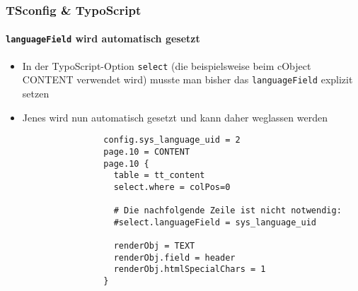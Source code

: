 \begin{frame}[fragile]
	\frametitle{TSconfig \& TypoScript}
	\framesubtitle{\texttt{languageField} wird automatisch gesetzt}

	\lstset{basicstyle=\tiny\ttfamily}

	\begin{itemize}

		\item In der TypoScript-Option \texttt{select} (die beispielsweise beim cObject CONTENT verwendet wird)
			musste man bisher das \texttt{languageField} explizit setzen

		\item Jenes wird nun automatisch gesetzt und kann daher weglassen werden


			\begin{lstlisting}
				config.sys_language_uid = 2
				page.10 = CONTENT
				page.10 {
				  table = tt_content
				  select.where = colPos=0

				  # Die nachfolgende Zeile ist nicht notwendig:
				  #select.languageField = sys_language_uid

				  renderObj = TEXT
				  renderObj.field = header
				  renderObj.htmlSpecialChars = 1
				}
			\end{lstlisting}

	\end{itemize}

\end{frame}


